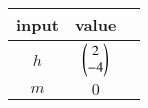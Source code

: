 \begin{tabular}[10pt]{ |c| c| c|}
    \hline
    \textbf{input} & \textbf{value}\\ 
    \hline
    $h$ &$\begin{pmatrix}2\\-4\end{pmatrix}$\\
    \hline 
    $m$ &$0$\\
    \hline 
    \end{tabular}
